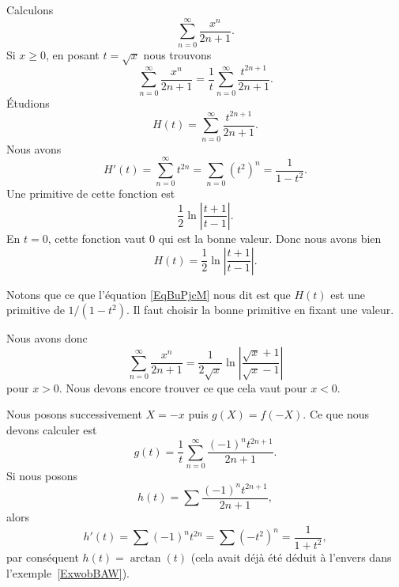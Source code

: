 \begin{example}
	Calculons
	\begin{equation}
		\sum_{n=0}^{\infty}\frac{ x^n }{ 2n+1 }.
	\end{equation}
	Si \( x\geq 0\), en posant \( t=\sqrt{x}\) nous trouvons
	\begin{equation}
		\sum_{n=0}^{\infty}\frac{ x^n }{ 2n+1 }=\frac{1}{ t }\sum_{n=0}^{\infty}\frac{ t^{2n+1} }{ 2n+1 }.
	\end{equation}
	Étudions
	\begin{equation}
		H(t)=\sum_{n=0}^{\infty}\frac{ t^{2n+1} }{ 2n+1 }.
	\end{equation}
	Nous avons
	\begin{equation}     \label{EqBuPjcM}
		H'(t)=\sum_{n=0}^{\infty}t^{2n}=\sum_{n=0}(t^2)^n=\frac{1}{ 1-t^2 }.
	\end{equation}
	Une primitive de cette fonction est
	\begin{equation}
		\frac{ 1 }{2}\ln\left| \frac{ t+1 }{ t-1 } \right|.
	\end{equation}
	En \( t=0\), cette fonction vaut \( 0\) qui est la bonne valeur. Donc nous avons bien
	\begin{equation}
		H(t)=\frac{ 1 }{2}\ln\left| \frac{ t+1 }{ t-1 } \right|.
	\end{equation}

	Notons que ce que l'équation \eqref{EqBuPjcM} nous dit est que \( H(t)\) est une primitive de \( 1/(1-t^2)\). Il faut choisir la bonne primitive en fixant une valeur.

	Nous avons donc
	\begin{equation}
		\sum_{n=0}^{\infty}\frac{ x^n }{ 2n+1 }=\frac{ 1 }{2\sqrt{x}}\ln\left| \frac{ \sqrt{x}+1 }{ \sqrt{x}-1 } \right|
	\end{equation}
	pour \( x>0\). Nous devons encore trouver ce que cela vaut pour \( x<0\).

	Nous posons successivement \( X=-x\) puis \( g(X)=f(-X)\). Ce que nous devons calculer est
	\begin{equation}
		g(t)=\frac{1}{ t }\sum_{n=0}^{\infty}\frac{ (-1)^nt^{2n+1} }{ 2n+1 }.
	\end{equation}
	Si nous posons
	\begin{equation}
		h(t)=\sum \frac{ (-1)^nt^{2n+1} }{ 2n+1 },
	\end{equation}
	alors
	\begin{equation}
		h'(t)=\sum (-1)^nt^{2n}=\sum (-t^2)^n=\frac{1}{ 1+t^2 },
	\end{equation}
	par conséquent \( h(t)=\arctan(t)\) (cela avait déjà été déduit à l'envers dans l'exemple~\ref{ExwobBAW}).


\end{example}
